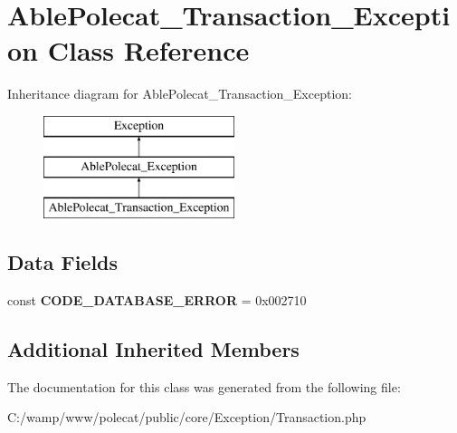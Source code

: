 \hypertarget{class_able_polecat___transaction___exception}{}\section{Able\+Polecat\+\_\+\+Transaction\+\_\+\+Exception Class Reference}
\label{class_able_polecat___transaction___exception}
Inheritance diagram for Able\+Polecat\+\_\+\+Transaction\+\_\+\+Exception\+:\begin{figure}[H]
\begin{center}
\leavevmode
\includegraphics[height=3.000000cm]{class_able_polecat___transaction___exception}
\end{center}
\end{figure}
\subsection*{Data Fields}
\begin{DoxyCompactItemize}
\item 
\hypertarget{class_able_polecat___transaction___exception_ac8d1bd1204eaae98fc4085db92bc52a5}{}const {\bfseries C\+O\+D\+E\+\_\+\+D\+A\+T\+A\+B\+A\+S\+E\+\_\+\+E\+R\+R\+O\+R} = 0x002710\label{class_able_polecat___transaction___exception_ac8d1bd1204eaae98fc4085db92bc52a5}

\end{DoxyCompactItemize}
\subsection*{Additional Inherited Members}


The documentation for this class was generated from the following file\+:\begin{DoxyCompactItemize}
\item 
C\+:/wamp/www/polecat/public/core/\+Exception/Transaction.\+php\end{DoxyCompactItemize}
